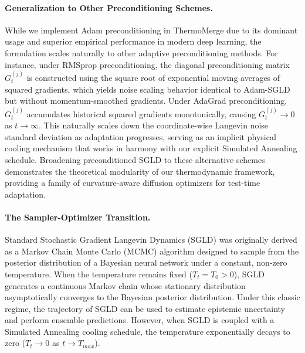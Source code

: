 \paragraph{Generalization to Other Preconditioning Schemes.} While we implement Adam preconditioning in ThermoMerge due to its dominant usage and superior empirical performance in modern deep learning, the formulation scales naturally to other adaptive preconditioning methods.
For instance, under RMSprop preconditioning, the diagonal preconditioning matrix $G_t^{(j)}$ is constructed using the square root of exponential moving averages of squared gradients, which yields noise scaling behavior identical to Adam-SGLD but without momentum-smoothed gradients.
Under AdaGrad preconditioning, $G_t^{(j)}$ accumulates historical squared gradients monotonically, causing $G_t^{(j)} \to 0$ as $t \to \infty$.
This naturally scales down the coordinate-wise Langevin noise standard deviation as adaptation progresses, serving as an implicit physical cooling mechanism that works in harmony with our explicit Simulated Annealing schedule.
Broadening preconditioned SGLD to these alternative schemes demonstrates the theoretical modularity of our thermodynamic framework, providing a family of curvature-aware diffusion optimizers for test-time adaptation.

\paragraph{The Sampler-Optimizer Transition.} Standard Stochastic Gradient Langevin Dynamics (SGLD) was originally derived as a Markov Chain Monte Carlo (MCMC) algorithm designed to sample from the posterior distribution of a Bayesian neural network under a constant, non-zero temperature.
When the temperature remains fixed ($T_t = T_0 > 0$), SGLD generates a continuous Markov chain whose stationary distribution asymptotically converges to the Bayesian posterior distribution.
Under this classic regime, the trajectory of SGLD can be used to estimate epistemic uncertainty and perform ensemble predictions.
However, when SGLD is coupled with a Simulated Annealing cooling schedule, the temperature exponentially decays to zero ($T_t \to 0$ as $t \to T_{max}$).

